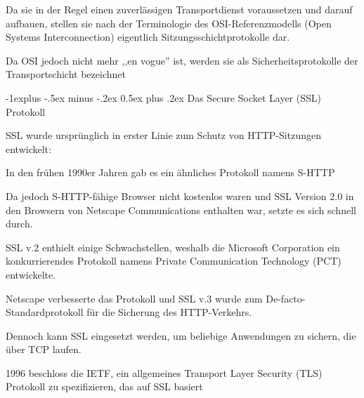 \documentclass[a4paper]{article}
\makeatletter
\renewcommand{\subsection}{\@startsection{subsection}{2}{0mm}%
 {-1explus -.5ex minus -.2ex}%
 {0.5ex plus .2ex}%
 {\normalfont\normalsize\bfseries}}
\makeatother
\begin{document}
\begin{multicols}{3}
\begin{itemize*}
\begin{itemize*}
                  \begin{itemize*}
                        \item Da sie in der Regel einen zuverlässigen Transportdienst voraussetzen und darauf aufbauen, stellen sie nach der Terminologie des OSI-Referenzmodells (Open Systems Interconnection) eigentlich Sitzungsschichtprotokolle dar.
                        \item Da OSI jedoch nicht mehr ,,en vogue'' ist, werden sie als Sicherheitsprotokolle der Transportschicht bezeichnet
                  \end{itemize*}
            \end{itemize*}


            \subsection{Das Secure Socket Layer (SSL)
                  Protokoll}

            \begin{itemize*}
                  \item
                  SSL wurde ursprünglich in erster Linie zum Schutz von HTTP-Sitzungen
                  entwickelt:

                  \begin{itemize*}
                        \item In den frühen 1990er Jahren gab es ein ähnliches Protokoll namens S-HTTP
                        \item Da jedoch S-HTTP-fähige Browser nicht kostenlos waren und SSL Version 2.0 in den Browsern von Netscape Communications enthalten war, setzte es sich schnell durch.
                        \item SSL v.2 enthielt einige Schwachstellen, weshalb die Microsoft Corporation ein konkurrierendes Protokoll namens Private Communication Technology (PCT) entwickelte.
                        \item Netscape verbesserte das Protokoll und SSL v.3 wurde zum De-facto-Standardprotokoll für die Sicherung des HTTP-Verkehrs.
                        \item Dennoch kann SSL eingesetzt werden, um beliebige Anwendungen zu sichern, die über TCP laufen.
                        \item 1996 beschloss die IETF, ein allgemeines Transport Layer Security (TLS) Protokoll zu spezifizieren, das auf SSL basiert
                  \end{itemize*}
            \end{itemize*}



\end{itemize*}
\end{multicols}
\end{document}
